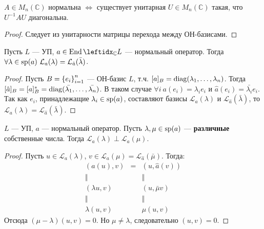\begin{cor}
    $A \in M_n(\mathbb{C})$ нормальна $\Leftrightarrow$ существует унитарная $U \in M_n(\mathbb{C})$ такая, что $U^{-1} AU$ диагональна.
\end{cor}

\begin{proof}
    Следует из унитарности матрицы перехода между ОН-базисами.
\end{proof}

\begin{cor}
    Пусть $L$ --- УП, $a \in \End \lsub{\mathbb{C}}{L}$ --- нормальный оператор. Тогда $\forall \lambda \in \operatorname{sp}(a)\ \mathcal{L}_a(\lambda) = \mathcal{L}_{\hat{a}}(\bar{\lambda})$.
\end{cor}

\begin{proof}
    Пусть $B = \left\{e_i\right\}_{i=1}^{n}$ --- ОН-базис $L$, т.ч. $[a]_B = \operatorname{diag}(\lambda_1, \dots, \lambda_n)$. Тогда $[\hat{a}]_B = [a]_B^* = \operatorname{diag}(\bar{\lambda_1}, \dots, \bar{\lambda_n})$. В таком случае $\forall i\ a(e_i) = \lambda_i e_i$ и $\hat{a}(e_i) = \bar{\lambda_i} e_i$. Так как $e_i$, принадлежащие $\lambda_i \in \operatorname{sp}(a)$, составляют базисы $\mathcal{L}_a(\lambda)$ и $\mathcal{L}_{\hat{a}}(\bar{\lambda})$, то $\mathcal{L}_a(\lambda) = \mathcal{L}_{\hat{a}}(\bar{\lambda})$.
\end{proof}

\begin{cor}
    $L$ --- УП, $a$ --- нормальный оператор. Пусть $\lambda, \mu \in \operatorname{sp}(a)$ --- \textbf{различные} собственные числа. Тогда $\mathcal{L}_a(\lambda) \perp \mathcal{L}_a(\mu)$.
\end{cor}

\begin{proof}
    Пусть $u \in \mathcal{L}_a(\lambda)$, $v \in \mathcal{L}_a(\mu) = \mathcal{L}_{\hat{a}}(\bar{\mu})$. Тогда:
    $$\begin{array}{ccc}
        (a(u), v)      & = & (u, \hat{a}(v)) \\
        \Vert          &   & \Vert           \\
        (\lambda u, v) &   & (u, \bar{\mu}v) \\
        \Vert          &   & \Vert           \\
        \lambda(u, v)  &   & \mu(u, v)
    \end{array}$$
    Отсюда $(\mu - \lambda)(u, v) = 0$. Но $\mu \neq \lambda$, следовательно $(u, v) = 0$.
\end{proof}